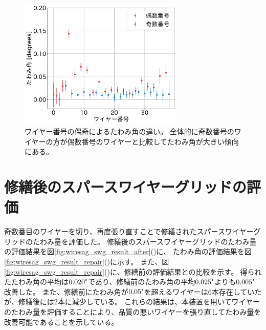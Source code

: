 \documentclass[../../main.tex]{subfiles}
\begin{document}
\begin{figure}[H]
    \centering
    \includegraphics[width=0.7\textwidth]{wiresag_swg/swg_sag_angle_before_even_odd.pdf}
    \caption{ワイヤー番号の偶奇によるたわみ角の違い。
    全体的に奇数番号のワイヤーの方が偶数番号のワイヤーと比較してたわみ角が大きい傾向にある。}
    \label{fig:wiresag_swg_even_odd}
\end{figure}

\section{修繕後のスパースワイヤーグリッドの評価}
奇数番目のワイヤーを切り、再度張り直すことで修繕されたスパースワイヤーグリッドのたわみ量を評価した。
修繕後のスパースワイヤーグリッドのたわみ量の評価結果を図\ref{fig:wiresag_swg_result_after}()に、
たわみ角の評価結果を図\ref{fig:wiresag_swg_result_repair}()に示す。
また、図\ref{fig:wiresag_swg_result_repair}()に、修繕前の評価結果との比較を示す。
得られたたわみ角の平均は$0.020\tcdegree$であり、修繕前のたわみ角の平均$0.025\tcdegree$よりも$0.005\tcdegree$改善した。
また、修繕前にたわみ角が$0.05\tcdegree$を超えるワイヤーは6本存在していたが、修繕後には2本に減少している。
これらの結果は、本装置を用いてワイヤーのたわみ量を評価することにより、品質の悪いワイヤーを張り直してたわみ量を改善可能であることを示している。


\end{document}
